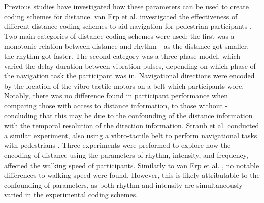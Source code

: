 \documentclass{interim}
\begin{document}
Previous studies have investigated how these parameters can be used to create coding schemes for distance. van Erp et al. investigated the effectiveness of different distance coding schemes to aid navigation for pedestrian participants \cite{10.1145/1060581.1060585}. Two main categories of distance coding schemes were used; the first was a monotonic relation between distance and rhythm - as the distance got smaller, the rhythm got faster. The second category was a three-phase model, which varied the delay duration between vibration pulses, depending on which phase of the navigation task the participant was in. Navigational directions were encoded by the location of the vibro-tactile motors on a belt which participants wore. Notably, there was no difference found in participant performance when comparing those with access to distance information, to those without - concluding that this may be due to the confounding of the distance information with the temporal resolution of the direction information. Straub et al. conducted a similar experiment, also using a vibro-tactile belt to perform navigational tasks with pedestrians \cite{5326374}. Three experiments were preformed to explore how the encoding of distance using the parameters of rhythm, intensity, and frequency, affected the walking speed of participants. Similarly to van Erp et al. \cite{10.1145/1060581.1060585}, no notable differences to walking speed were found. However, this is likely attributable to the confounding of parameters, as both rhythm and intensity are simultaneously varied in the experimental coding schemes.
\end{document}
